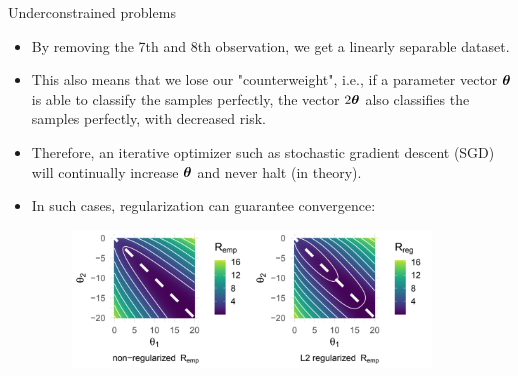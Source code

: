 \begin{vbframe} {Underconstrained problems}
\begin{footnotesize}
\begin{itemize}
\item By removing the 7th and 8th observation, we get a linearly separable dataset. \\
\item This also means that we lose our "counterweight", i.e., if a parameter vector $\bm{\theta}$ is able to classify the samples perfectly, the vector $2\bm{\theta}$ also classifies the samples perfectly, with decreased risk.
    \item Therefore, an iterative optimizer such as stochastic gradient descent (SGD) will continually increase $\bm{\theta}$ and never halt (in theory).
    \item In such cases, regularization can guarantee convergence:


\begin{figure}
\includegraphics[width=0.9\textwidth]{figure_man/undercons-problem.png}\\
\end{figure}


\end{itemize}
\end{footnotesize}
\end{vbframe}

\endlecture


